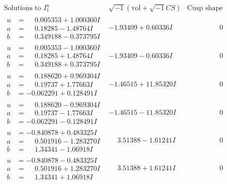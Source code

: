 \documentclass[1p]{elsarticle_modified}
\theoremstyle{definition}
\newcommand{\I}{\sqrt{-1}}
\begin{document}
$$\begin{array}{c|c|c}  
\text{Solutions to }I^u_{1}& \I (\text{vol} + \sqrt{-1}CS) & \text{Cusp shape}\\
 \hline 
\begin{aligned}
u &= \phantom{-}0.005353 + 1.000360 I \\
a &= \phantom{-}0.18285 - 1.48764 I \\
b &= \phantom{-}0.349188 - 0.373795 I\end{aligned}
 & -1.93409 + 0.60336 I & \phantom{-0.000000 } 0 \\ \hline\begin{aligned}
u &= \phantom{-}0.005353 - 1.000360 I \\
a &= \phantom{-}0.18285 + 1.48764 I \\
b &= \phantom{-}0.349188 + 0.373795 I\end{aligned}
 & -1.93409 - 0.60336 I & \phantom{-0.000000 } 0 \\ \hline\begin{aligned}
u &= \phantom{-}0.188620 + 0.969304 I \\
a &= \phantom{-}0.19737 + 1.77663 I \\
b &= -0.062291 + 0.128491 I\end{aligned}
 & -1.46515 + 11.85320 I & \phantom{-0.000000 } 0 \\ \hline\begin{aligned}
u &= \phantom{-}0.188620 - 0.969304 I \\
a &= \phantom{-}0.19737 - 1.77663 I \\
b &= -0.062291 - 0.128491 I\end{aligned}
 & -1.46515 - 11.85320 I & \phantom{-0.000000 } 0 \\ \hline\begin{aligned}
u &= -0.840878 + 0.483325 I \\
a &= \phantom{-}0.501916 - 1.283270 I \\
b &= \phantom{-}1.34341 - 1.06918 I\end{aligned}
 & \phantom{-}3.51388 - 1.61241 I & \phantom{-0.000000 } 0 \\ \hline\begin{aligned}
u &= -0.840878 - 0.483325 I \\
a &= \phantom{-}0.501916 + 1.283270 I \\
b &= \phantom{-}1.34341 + 1.06918 I\end{aligned}
 & \phantom{-}3.51388 + 1.61241 I & \phantom{-0.000000 } 0 \\ \hline\begin{aligned}

\end{aligned}
\end{array}$$
\end{document}
